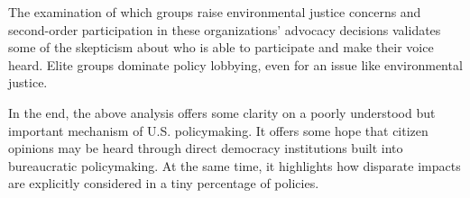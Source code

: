 \documentclass[
      12pt,
        ]{article}
\begin{document}
The examination of which groups raise environmental justice concerns and
second-order participation in these organizations' advocacy decisions validates some of the skepticism about who is able to
participate and make their voice heard. Elite groups dominate policy lobbying, even for
an issue like environmental justice.

In the end, the above analysis offers some clarity on a poorly
understood but important mechanism of U.S. policymaking. It offers
some hope that citizen opinions may be heard through direct democracy
institutions built into bureaucratic policymaking. At the same time, it highlights how disparate impacts are explicitly considered in a tiny percentage of policies.
\newpage
\singlespacing 
           
   
\end{document}
